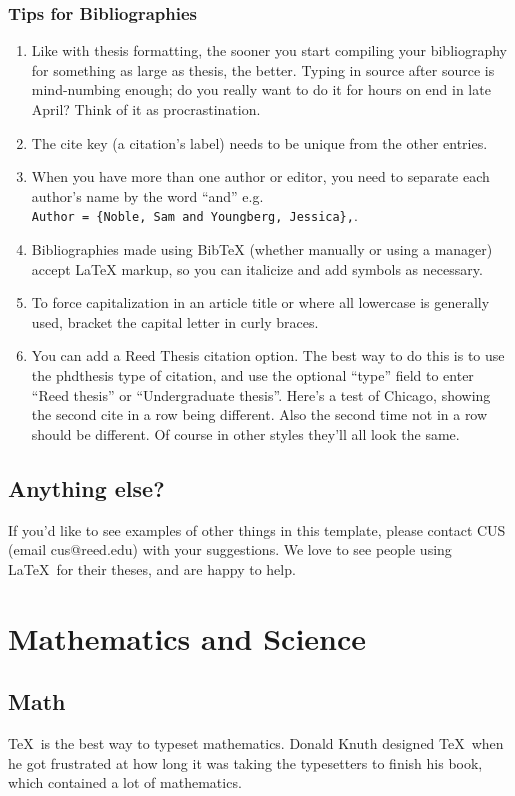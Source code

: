 \documentclass[12pt,twoside]{reedthesis}
\theoremstyle{plain}   %
\theoremstyle{definition}
\theoremstyle{remark}
\numberwithin{equation}{section}
\begin{document}
\subsection{Tips for Bibliographies}
\begin{enumerate}
\item Like with thesis formatting, the sooner you start compiling your bibliography for something as large as thesis, the better. Typing in source after source is mind-numbing enough; do you really want to do it for hours on end in late April? Think of it as procrastination.
\item The cite key (a citation's label) needs to be unique from the other entries.
\item When you have more than one author or editor, you need to separate each author's name by the word ``and'' e.g.\\ \verb+Author = {Noble, Sam and Youngberg, Jessica},+.
\item Bibliographies made using BibTeX (whether manually or using a manager) accept LaTeX markup, so you can italicize and add symbols as necessary.
\item To force capitalization in an article title or where all lowercase is generally used, bracket the capital letter in curly braces.
\item You can add a Reed Thesis citation option. The best way to do this is to use the phdthesis type of citation, and use the optional ``type'' field to enter ``Reed thesis'' or ``Undergraduate thesis''. Here's a test of Chicago, showing the second cite in a row being different. Also the second time not in a row should be different. Of course in other styles they'll all look the same.
\end{enumerate}
\section{Anything else?}
If you'd like to see examples of other things in this template, please contact CUS (email cus@reed.edu) with your suggestions. We love to see people using \LaTeX\ for their theses, and are happy to help.


\chapter{Mathematics and Science}	
\section{Math}
	\TeX\ is the best way to typeset mathematics. Donald Knuth designed \TeX\ when he got frustrated at how long it was taking the typesetters to finish his book, which contained a lot of mathematics. 
	
\end{document}
